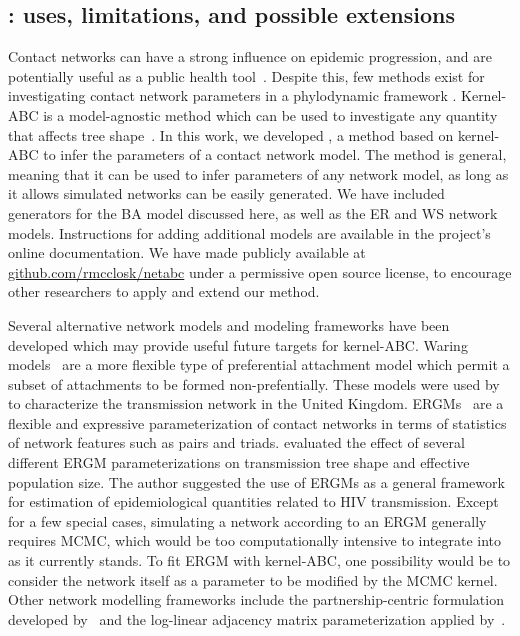 \subsection{: uses, limitations, and possible extensions}

Contact networks can have a strong influence on epidemic progression, and are
potentially useful as a public health tool~\autocite{wang2015targeting,
little2014using}. Despite this, few methods exist for investigating contact
network parameters in a phylodynamic framework \autocite[although see][for
related work]{groendyke2011bayesian, volz2008sir, brown2011transmission,
leventhal2012inferring, greenbaum2016inference}. Kernel-ABC is a model-agnostic
method which can be used to investigate any quantity that affects tree
shape~\autocite{poon2015phylodynamic}. In this work, we developed
, a method based on kernel-ABC to infer the parameters of a
contact network model. The method is general, meaning that it can be used to
infer parameters of any network model, as long as it allows simulated networks
can be easily generated. We have included generators for the \gls{BA} model
discussed here, as well as the \gls{ER} and \gls{WS} network models.
Instructions for adding additional models are available in the project's online
documentation. We have made  publicly available at
\url{github.com/rmcclosk/netabc} under a permissive open source license, to
encourage other researchers to apply and extend our method.

Several alternative network models and modeling frameworks have been developed
which may provide useful future targets for kernel-\gls{ABC}. Waring
models~\autocite{irwin1963place,handcock2004likelihood} are a more flexible
type of preferential attachment model which permit a subset of attachments to
be formed non-prefentially. These models were used by
\textcite{brown2011transmission} to characterize the transmission network in
the United Kingdom. \Glspl{ERGM}~\autocite{robins2007introduction} are a
flexible and expressive parameterization of contact networks in terms of
statistics of network features such as pairs and triads.
\textcite{goodreau2006assessing} evaluated the effect of several different
\gls{ERGM} parameterizations on transmission tree shape and effective
population size. The author suggested the use of \glspl{ERGM} as a general
framework for estimation of epidemiological quantities related to \gls{HIV}
transmission. Except for a few special cases, simulating a network according to
an \gls{ERGM} generally requires \gls{MCMC}, which would be too computationally
intensive to integrate into  as it currently stands. To fit
\gls{ERGM} with kernel-\gls{ABC}, one possibility would be to consider the
network itself as a parameter to be modified by the \gls{MCMC} kernel.
Other network modelling frameworks include the partnership-centric formulation
developed by~\textcite{eames2002modeling} and the log-linear adjacency matrix
parameterization applied by~\textcite{morris1993epidemiology}.

